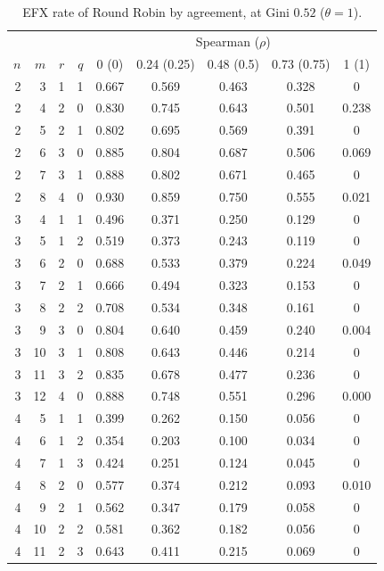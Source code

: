 \begin{table}[p]
  \centering
  \caption{EFX rate of Round Robin by agreement, at Gini $0.52$ ($\theta=1$).}
  \label{tab:full-spearman}
  \footnotesize
  \begin{tabular}{rrrr ccccc}
    \toprule
    & & & & \multicolumn{5}{c}{Spearman ($\rho$)} \\
    $n$ & $m$ & $r$ & $q$ & 0 (0) & 0.24 (0.25) & 0.48 (0.5) & 0.73 (0.75) & 1 (1) \\
    \midrule
2 & 3 & 1 & 1 & 0.667 & 0.569 & 0.463 & 0.328 & 0 \\
2 & 4 & 2 & 0 & 0.830 & 0.745 & 0.643 & 0.501 & 0.238 \\
2 & 5 & 2 & 1 & 0.802 & 0.695 & 0.569 & 0.391 & 0 \\
2 & 6 & 3 & 0 & 0.885 & 0.804 & 0.687 & 0.506 & 0.069 \\
2 & 7 & 3 & 1 & 0.888 & 0.802 & 0.671 & 0.465 & 0 \\
2 & 8 & 4 & 0 & 0.930 & 0.859 & 0.750 & 0.555 & 0.021 \\
\midrule
3 & 4 & 1 & 1 & 0.496 & 0.371 & 0.250 & 0.129 & 0 \\
3 & 5 & 1 & 2 & 0.519 & 0.373 & 0.243 & 0.119 & 0 \\
3 & 6 & 2 & 0 & 0.688 & 0.533 & 0.379 & 0.224 & 0.049 \\
3 & 7 & 2 & 1 & 0.666 & 0.494 & 0.323 & 0.153 & 0 \\
3 & 8 & 2 & 2 & 0.708 & 0.534 & 0.348 & 0.161 & 0 \\
3 & 9 & 3 & 0 & 0.804 & 0.640 & 0.459 & 0.240 & 0.004 \\
3 & 10 & 3 & 1 & 0.808 & 0.643 & 0.446 & 0.214 & 0 \\
3 & 11 & 3 & 2 & 0.835 & 0.678 & 0.477 & 0.236 & 0 \\
3 & 12 & 4 & 0 & 0.888 & 0.748 & 0.551 & 0.296 & 0.000 \\
\midrule
4 & 5 & 1 & 1 & 0.399 & 0.262 & 0.150 & 0.056 & 0 \\
4 & 6 & 1 & 2 & 0.354 & 0.203 & 0.100 & 0.034 & 0 \\
4 & 7 & 1 & 3 & 0.424 & 0.251 & 0.124 & 0.045 & 0 \\
4 & 8 & 2 & 0 & 0.577 & 0.374 & 0.212 & 0.093 & 0.010 \\
4 & 9 & 2 & 1 & 0.562 & 0.347 & 0.179 & 0.058 & 0 \\
4 & 10 & 2 & 2 & 0.581 & 0.362 & 0.182 & 0.056 & 0 \\
4 & 11 & 2 & 3 & 0.643 & 0.411 & 0.215 & 0.069 & 0 \\

\end{tabular}
\end{table}

